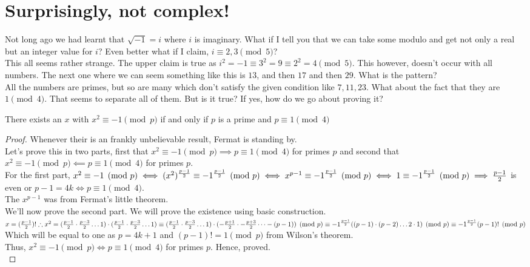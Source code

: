 \section{Surprisingly, not complex!}
Not long ago we had learnt that $\sqrt{-1}=i$ where $i$ is imaginary. What if I tell you that we can take some modulo and get not only a real but an integer value for $i$? Even better what if I claim, $i \equiv 2,3 \pmod{5}$?\\
This all seems rather strange. The upper claim is true as $i^2=-1 \equiv 3^2= 9 \equiv 2^2=4 \pmod{5}$. This however, doesn't occur with all numbers. The next one where we can seem something like this is $13$, and then $17$ and then $29$. What is the pattern?\\
All the numbers are primes, but so are many which don't satisfy the given condition like $7,11,23$. What about the fact that they are $1 \pmod{4}$. That seems to separate all of them. But is it true? If yes, how do we go about proving it?\\
\begin{theorem}
    There exists an $x$ with $x^2 \equiv -1 \pmod{p}$ if and only if $p$ is a prime and $p \equiv 1 \pmod{4}$
\end{theorem}
\begin{proof}
    Whenever their is an frankly unbelievable result, Fermat is standing by.\\
    Let's prove this in two parts, first that $x^2\equiv -1 \pmod{p} \implies p \equiv 1 \pmod{4}$ for primes $p$ and  second that $x^2\equiv -1 \pmod{p} \impliedby p \equiv 1 \pmod{4}$ for primes $p$.\\
    For the first part, $x^2 \equiv -1 \pmod{p}\\
    \iff (x^2)^{\frac{p-1}{2}} \equiv -1^{\frac{p-1}{2}} \pmod{p}\\
    \iff x^{p-1} \equiv -1^{\frac{p-1}{2}} \pmod{p}\\
    \iff 1 \equiv -1^{\frac{p-1}{2}} \pmod{p}\\
    \implies \frac{p-1}{2}$ is even or $p-1=4k \iff p \equiv 1 \pmod{4}$.\\
    The $x^{p-1}$ was from Fermat's little theorem.\\
    We'll now prove the second part. We will prove the existence using basic construction.\\
    $x = (\frac{p-1}{2})!\\
    \therefore x^2 = (\frac{p-1}{2} \cdot \frac{p-3}{2} \dots 1)\cdot (\frac{p-1}{2} \cdot \frac{p-3}{2} \dots 1)\\
    \equiv (\frac{p-1}{2} \cdot \frac{p-3}{2} \dots 1)\cdot (-\frac{p+1}{2} \cdot -\frac{p+3}{2} \dots -(p-1)) \pmod{p}\\
    \equiv -1^{\frac{p-1}{2}} ((p-1) \cdot (p-2)\dots 2 \cdot 1) \pmod{p}\\
    \equiv -1^{\frac{p-1}{2}} (p-1)! \pmod{p}$\\
    Which will be equal to one as $p=4k+1$ and $(p-1)! = 1 \pmod{p}$ from Wilson's theorem.\\
    Thus, $x^2\equiv -1 \pmod{p} \iff p \equiv 1 \pmod{4}$ for primes $p$. Hence, proved.\\ 
\end{proof}
